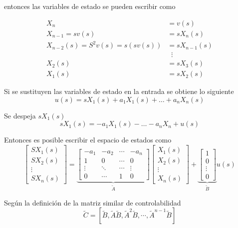 entonces las variables de estado se pueden escribir como

\[
    \begin{split}
        X_{n} & = v(s)\\
        X_{n-1} = sv(s) & = sX_{n}(s)\\
        X_{n-2}(s) = S^{2}v(s) =s(sv(s)) & = sX_{n-1}(s)\\
        &\;\;\vdots\\
        X_{2}(s) & = sX_{3}(s)\\
        X_{1}(s) & = sX_{2}(s)
    \end{split}
\]

Si se sustituyen las variables de estado en la entrada se obtiene lo siguiente
\[
    u(s) = sX_{1}(s) + a_{1}X_{1}(s) + \ldots + a_{n}X_{n}(s)
\]

Se despeja \( sX_{1}(s) \)
\[
    sX_{1}(s) = -a_{1}X_{1}(s) - \ldots - a_{n}X_{n} + u(s)
\]

Entonces es posible escribir el espacio de estados como
\[
    \begin{bmatrix}
        SX_{1}(s) \\
        SX_{2}(s) \\
        \vdots \\
        SX_{n}(s)
    \end{bmatrix}
    =
    \underbrace{
        \begin{bmatrix}
        -a_{1} & -a_{2} & \cdots & -a_{n}\\
        1 & 0 & \cdots & 0 \\
        \vdots & \ddots & \cdots & \vdots \\
        0 & \cdots & 1 & 0
        \end{bmatrix}
                }_{\tilde{A}}
    \begin{bmatrix}
        X_{1}(s) \\
        X_{2}(s) \\
        \vdots \\
        X_{n}(s)
    \end{bmatrix}
    +
    \underbrace{
        \begin{bmatrix}
        1\\
        0\\
        \vdots\\
        0
        \end{bmatrix}
                }_{\tilde{B}}
     u(s)
\]

Según la definición de la matriz similar de controlabilidad
\[
    \tilde{C} = [
    \tilde{B},
    \tilde{A}\tilde{B},
    \tilde{A}^{2}\tilde{B},
    \cdots,
    \tilde{A}^{n-1}\tilde{B} ]
\]

